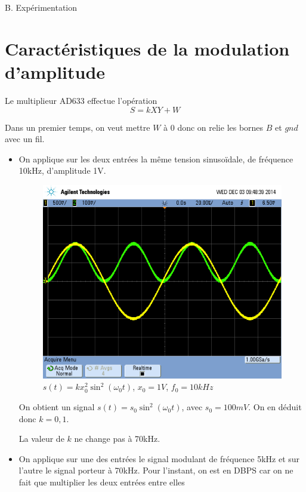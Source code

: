 \documentclass[../../Cours_M1.tex]{subfiles}
\begin{document}
\newpage
\begin{center}
\begin{Large}
B. Expérimentation
\end{Large}
\end{center}

\setcounter{section}{0}

\section{Caractéristiques de la modulation d'amplitude}

Le multiplieur AD633 effectue l'opération
\[S = kXY + W\]

Dans un premier temps, on veut mettre $W$ à 0 donc on relie les bornes $B$ et $gnd$ avec un fil.

\begin{itemize}
\item On applique sur les deux entrées la même tension sinusoïdale, de fréquence 10kHz, d'amplitude 1V.

\begin{figure}[h!]
\centering
\includegraphics[scale=0.2]{gain_k.png}
\caption{$s(t)=kx_0^2\sin^2(\omega_0 t)$, $x_0=1V$, $f_0=10kHz$}
\end{figure}

On obtient un signal $s(t)=s_0\sin^2(\omega_0 t)$, avec $s_0=100mV$. On en déduit donc $k=0,1$.

La valeur de $k$ ne change pas à 70kHz.

\item On applique sur une des entrées le signal modulant de fréquence 5kHz et sur l'autre le signal porteur à 70kHz. Pour l'instant, on est en DBPS car on ne fait que multiplier les deux entrées entre elles


\end{itemize}
\end{document}
